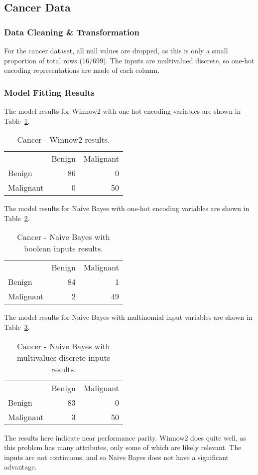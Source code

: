 \documentclass{amsart}
\begin{document}
\subsection{Cancer Data}
    \subsubsection*{Data Cleaning \& Transformation}
    For the cancer dataset\cite{cancerdataset}, all null values are dropped, as this is only a small proportion of total rows (16/699).
    The inputs are multivalued discrete, so one-hot encoding representations are made of each column.
    \subsubsection*{Model Fitting Results}
    The model results for Winnow2 with one-hot encoding variables are shown in Table~\ref{cancer_winnow2}.
    \begin{table}
    \begin{tabular}{lrr}
    {} &  Benign  &   Malignant \\
    Benign &  86 &   0 \\
    Malignant &   0 &  50 \\
    \end{tabular}
    \caption{Cancer - Winnow2 results.}
    \label{cancer_winnow2}
    \end{table}
    The model results for Naive Bayes with one-hot encoding variables are shown in Table~\ref{cancer_nb_bool}.
    \begin{table}
    \begin{tabular}{lrr}
    {} &  Benign  &   Malignant \\
    Benign &  84 &   1 \\
    Malignant &   2 &  49 \\
    \end{tabular}
    \caption{Cancer - Naive Bayes with boolean inputs results.}
    \label{cancer_nb_bool}
    \end{table}
    The model results for Naive Bayes with multinomial input variables are shown in Table~\ref{cancer_nb}.
    \begin{table}
    \begin{tabular}{lrr}
    {} &  Benign  &   Malignant \\
    Benign &  83 &   0 \\
    Malignant &   3 &  50 \\
    \end{tabular}
    \caption{Cancer - Naive Bayes with multivalues discrete inputs results.}
    \label{cancer_nb}
    \end{table}
The results here indicate near performance parity. Winnow2 does quite well, as this problem has many attributes, only some
of which are likely relevant. The inputs are not continuous, and so Naive Bayes does not have a significant advantage.
\end{document}
